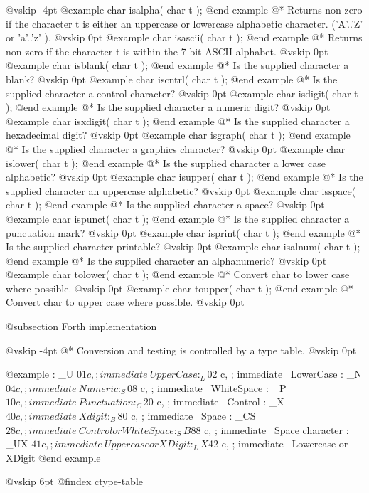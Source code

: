 @vskip -4pt
@example
char isalpha( char t ); @end example
@*
Returns non-zero if the character t is either an uppercase or
lowercase alphabetic character. ('A'..'Z' or 'a'..'z' ).
@vskip 0pt
@example
char isascii( char t ); @end example
@*
Returns non-zero if the character t is within the 7 bit
ASCII alphabet.
@vskip 0pt
@example
char isblank( char t ); @end example
@*
Is the supplied character a blank?
@vskip 0pt
@example
char iscntrl( char t ); @end example
@*
Is the supplied character a control character?
@vskip 0pt
@example
char isdigit( char t ); @end example
@*
Is the supplied character a numeric digit?
@vskip 0pt
@example
char isxdigit( char t ); @end example
@*
Is the supplied character a hexadecimal digit?
@vskip 0pt
@example
char isgraph( char t ); @end example
@*
Is the supplied character a graphics character?
@vskip 0pt
@example
char islower( char t ); @end example
@*
Is the supplied character a lower case alphabetic?
@vskip 0pt
@example
char isupper( char t ); @end example
@*
Is the supplied character an uppercase alphabetic?
@vskip 0pt
@example
char isspace( char t ); @end example
@*
Is the supplied character a space?
@vskip 0pt
@example
char ispunct( char t ); @end example
@*
Is the supplied character a puncuation mark?
@vskip 0pt
@example
char isprint( char t ); @end example
@*
Is the supplied character printable?
@vskip 0pt
@example
char isalnum( char t ); @end example
@*
Is the supplied character an alphanumeric?
@vskip 0pt
@example
char tolower( char t ); @end example
@*
Convert char to lower case where possible.
@vskip 0pt
@example
char toupper( char t ); @end example
@*
Convert char to upper case where possible.
@vskip 0pt

@subsection Forth implementation


@vskip -4pt
@*
Conversion and testing is controlled by a type table.
@vskip 0pt

@example
: _U    $01 c, ; immediate          \  UpperCase
: _L    $02 c, ; immediate          \  LowerCase
: _N    $04 c, ; immediate          \  Numeric
: _S    $08 c, ; immediate          \  WhiteSpace
: _P    $10 c, ; immediate          \  Punctuation
: _C    $20 c, ; immediate          \  Control
: _X    $40 c, ; immediate          \  Xdigit
: _B    $80 c, ; immediate          \  Space
: _CS   $28 c, ; immediate          \  Control or WhiteSpace
: _SB   $88 c, ; immediate          \  Space character
: _UX   $41 c, ; immediate          \  Uppercase or XDigit
: _LX   $42 c, ; immediate          \  Lowercase or XDigit
 @end example

@vskip 6pt
@findex ctype-table

